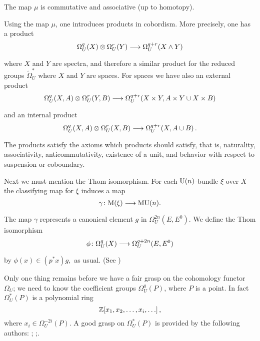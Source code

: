 \documentclass[../main]{subfiles}
\begin{document}
The map $\mu$ is commutative and associative (up to homotopy).

Using the map $\mu$, one introduces products in cobordism. 
More precisely, one has a product
\begin{equation*}
	\Omega_{U}^q(X) \otimes \Omega_{U}^r(Y) \lar{} \Omega_{U}^{q+r} (X \wedge Y)
\end{equation*}
where $X$ and $Y$ are spectra, and therefore a similar product for the reduced groups $\tilde{\Omega}^{\ast}_{U}$ where $X$ and $Y$ are spaces.
For spaces we have also an external product 
\begin{equation*}
  \Omega^{q}_{U}(X,A) \otimes \Omega^{r}_{U}(Y,B) \lar{} \Omega^{q+r}_{U}(X \times Y, A \times Y \cup X \times B)
\end{equation*}
and an internal product
\begin{equation*}
  \Omega^{q}_{U}(X,A) \otimes \Omega^{r}_{U}(X,B) \lar{} \Omega^{q+r}_{U}(X, A \cup  B )\, .
\end{equation*}
The products satisfy the axioms which products should satisfy, that is, naturality, associativity, anticommutativity, existence of a unit, and behavior with respect to suspension or coboundary.

Next we must mention the Thom isomorphism.
For each $\mathrm{U}(n)$-bundle $\xi$ over $X$ the classifying map for $\xi$ induces a map
\begin{equation*}
	\gamma\colon \te{M}(\xi) \lar{}  \te{MU}(n).
\end{equation*}
The map $\gamma$ represents a canonical element $g$ in $\Omega^{2n}_{U}(E,E^{0})$. 
We define the Thom isomorphism
\begin{equation*}
	\phi\colon  \Omega^{q}_{U}(X) \lar{} \Omega^{q+2n}_{U}(E,E^{0})
\end{equation*}
by $\phi(x) \in {(p^{\ast} x)g,}$ as usual. 
(See \cite{Dold})

Only one thing remains before we have a fair grasp on the cohomology functor $\Omega^{}_{U}$; 
we need to know the coefficient groups $\Omega^{q}_{U}(P)$, where $P$ is a point. 
In fact $\Omega^{\ast}_{U}(P)$ is a polynomial ring
\begin{equation*}
	\mathbb{Z}[x_1,x_2,\ldots,x_{i},\ldots]\, ,
\end{equation*}
where $x_{i} \in \Omega^{-2i}_{U}(P)$. 
A good grasp on $\Omega^{\ast}_{U}(P)$ is provided by the following authors: \cite{milnor2}; 
\cite{stong};\cite{hattori}.
\end{document}
